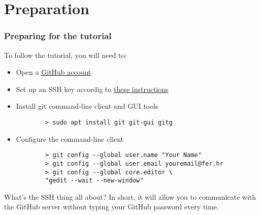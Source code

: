 \section{Preparation}

\begin{frame}[fragile]
	\frametitle{Preparing for the tutorial}
	
	To follow the tutorial, you will need to:
	\begin{itemize}
		\item  Open a \href{https://github.com/join?source=header-home}{GitHub account}
		\item Set up an SSH key accordig to \href{https://help.github.com/articles/adding-a-new-ssh-key-to-your-github-account/}{these instructions}
		\item Install git command-line client and GUI tools
		\begin{verbatim}
		> sudo apt install git git-gui gitg
		\end{verbatim}
		\item Configure the command-line client
		\begin{verbatim}
		> git config --global user.name "Your Name"
		> git config --global user.email youremail@fer.hr
		> git config --global core.editor \
		"gedit --wait --new-window"
		\end{verbatim}
	\end{itemize}
	
	\begin{block}{What's the SSH thing all about?}
	In short, it will allow you to communicate with the GitHub server without typing your GitHub password every time.
	\end{block}
\end{frame}

